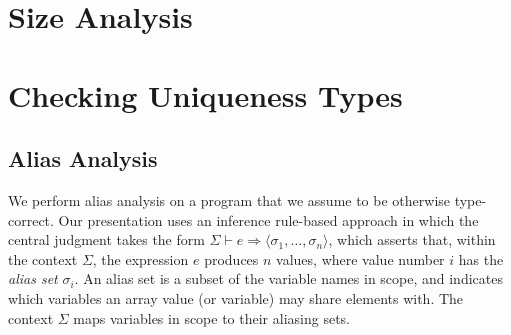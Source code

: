 \section{Size Analysis}


\section{Checking Uniqueness Types}

\subsection{Alias Analysis}

\newcommand{\expAliases}[3]{#1 \vdash #2 \Rightarrow #3}
\newcommand{\aliases}[1]{\textrm{aliases}(#1)}
\newcommand{\seqOccurences}[3]{#1 \gg #2 : #3}

We perform alias analysis on a program that we assume to be otherwise
type-correct.  Our presentation uses an inference rule-based approach
in which the central judgment takes the form %
$\expAliases{\Sigma}{e}{\langle \sigma_{1}, \ldots, \sigma_{n} \rangle}$, which
asserts that, within the context $\Sigma$, the
expression $e$ produces $n$ values, where value number $i$ has the
\textit{alias set} $\sigma_{i}$.  An alias set is a subset of the
variable names in scope, and indicates which variables an array value
(or variable) may share elements with.
The context $\Sigma$ maps variables in scope
to their aliasing sets.

